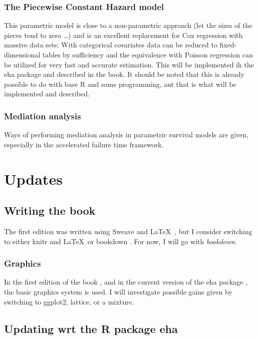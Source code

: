 \documentclass[a4paper,11pt]{article}
\begin{document}
\subsubsection{The Piecewise Constant Hazard model}

This parametric model is close to a non-parametric approach (let the sizes
of the pieces tend to zero \ldots) and is an excellent replacement for Cox
regression with massive data sets: With categorical covariates data can be
reduced to fixed-dimensional tables by sufficiency and the equivalence
with Poisson regression can be utilized for very fast and accurate
estimation. This will be implemented ih the eha package and described in
the book. It should be noted that this is already possible to do with base R
and some programming, ant that is what will be implemented and described.   

\subsubsection{Mediation analysis}

Ways of performing mediation analysis in parametric survival models are
given, especially in the accelerated failure time framework.


\section{Updates} \label{sec:updates}

\subsection{Writing the book}

The first edition was written using Sweave \citep{sweave02} and \LaTeX\
\citep{lamport}, but I consider 
switching to either knitr \citep{knitr15} and \LaTeX\ or bookdown 
\citep{bookdown16}. For now, I will go with \emph{bookdown}.

\subsubsection{Graphics}

In the first edition of the book \citep{ehar12}, and in the current version
of the eha package \citep{eha}, the basic graphics system is used. I will 
investigate possible gains given by switching to ggplot2, lattice, or a
mixture.


\subsection{Updating wrt the R package eha}
\end{document}
